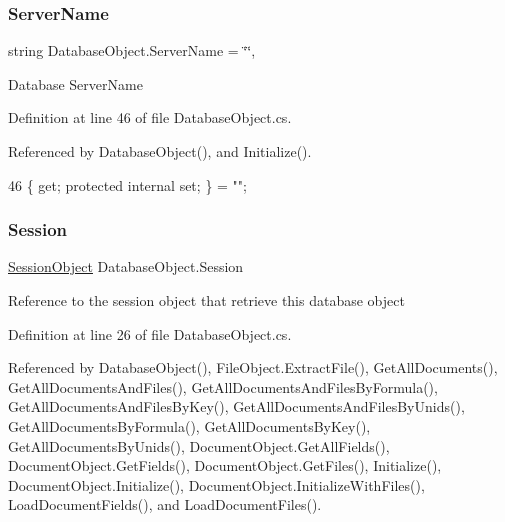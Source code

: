 \subsubsection{\texorpdfstring{Server\+Name}{ServerName}}
{\footnotesize\ttfamily string Database\+Object.\+Server\+Name = \char`\"{}\char`\"{}\hspace{0.3cm}{\ttfamily [get]}, {\ttfamily [set]}}



Database Server\+Name 



Definition at line 46 of file Database\+Object.\+cs.



Referenced by Database\+Object(), and Initialize().


\begin{DoxyCode}
46 \{ \textcolor{keyword}{get}; \textcolor{keyword}{protected} \textcolor{keyword}{internal} \textcolor{keyword}{set}; \} = \textcolor{stringliteral}{""};
\end{DoxyCode}
\mbox{\label{class_database_object_aa8484162b7d2a7c4c9426bca13c64c07}} 
\subsubsection{\texorpdfstring{Session}{Session}}
{\footnotesize\ttfamily \mbox{\hyperlink{class_session_object}{Session\+Object}} Database\+Object.\+Session\hspace{0.3cm}{\ttfamily [get]}}



Reference to the session object that retrieve this database object 



Definition at line 26 of file Database\+Object.\+cs.



Referenced by Database\+Object(), File\+Object.\+Extract\+File(), Get\+All\+Documents(), Get\+All\+Documents\+And\+Files(), Get\+All\+Documents\+And\+Files\+By\+Formula(), Get\+All\+Documents\+And\+Files\+By\+Key(), Get\+All\+Documents\+And\+Files\+By\+Unids(), Get\+All\+Documents\+By\+Formula(), Get\+All\+Documents\+By\+Key(), Get\+All\+Documents\+By\+Unids(), Document\+Object.\+Get\+All\+Fields(), Document\+Object.\+Get\+Fields(), Document\+Object.\+Get\+Files(), Initialize(), Document\+Object.\+Initialize(), Document\+Object.\+Initialize\+With\+Files(), Load\+Document\+Fields(), and Load\+Document\+Files().


